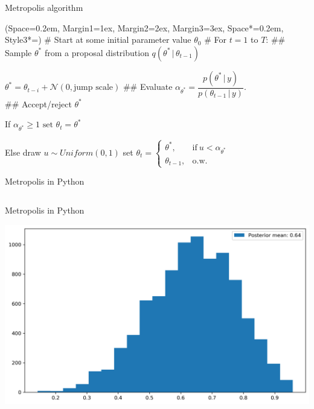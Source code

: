 \documentclass[12pt, aspectratio=149]{beamer}
\newcommand{\listSpace}{0.2em}
\theoremstyle{plain}
\begin{document}
\begin{frame}[fragile]{Metropolis algorithm}
	\begin{easylist}[enumerate]
		\ListProperties(Space=\listSpace, Margin1=1ex, Margin2=2ex, Margin3=3ex, Space*=\listSpace, Style3*=\space)
		# Start at some initial parameter value $\theta_0$
		# For $t=1$ to $T$:
		## Sample $\theta^*$ from a proposal distribution $q(\theta^* \, \vert \, \theta_{t-1})$
  
		\quad  $\theta^* = \theta_{t-i} + \mathcal{N}(0, \text{jump scale})$
		## Evaluate $\alpha_{\theta^*}= \dfrac{p(\theta^* \, \vert \, y)}{p(\theta_{t-1} \, \vert \, y)}$.\\
		## Accept/reject $\theta^*$    
  
		\quad If $\alpha_{\theta^*} \geq 1 \text{ set } \theta_t=\theta^*$   
  
		\quad Else draw  $u \sim Uniform(0, 1)$
		\quad  set $\theta_t = \begin{cases}\theta^*, &\text{if}\ u < \alpha_{\theta^*} \\ \theta_{t-1}, &\text{o.w.}\ \end{cases}$
	\end{easylist}
\end{frame}

\begin{frame}[fragile]{Metropolis in Python}
	\begin{center}
		\inputminted[fontsize=\tiny]{python}{../code/metropolis.py}
	\end{center}
\end{frame}

\begin{frame}[fragile]{Metropolis in Python}
	\begin{center}
		\includegraphics[width=.7\textwidth]{figs/metropolis.png}
	\end{center}
\end{frame}
\end{document}
